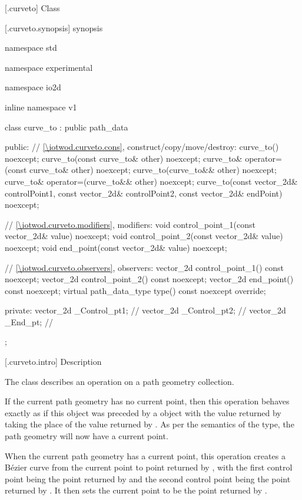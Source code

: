  [\iotwod.curveto] {Class }

 [\iotwod.curveto.synopsis] { synopsis}

\begin{codeblock}
namespace std { namespace experimental { namespace io2d { inline namespace v1 {
  class curve_to : public path_data {
  public:
    // \ref{\iotwod.curveto.cons}, construct/copy/move/destroy:
    curve_to() noexcept;
    curve_to(const curve_to& other) noexcept;
    curve_to& operator=(const curve_to& other) noexcept;
    curve_to(curve_to&& other) noexcept;
    curve_to& operator=(curve_to&& other) noexcept;
    curve_to(const vector_2d& controlPoint1, const vector_2d& controlPoint2,
      const vector_2d& endPoint) noexcept;

    // \ref{\iotwod.curveto.modifiers}, modifiers:
    void control_point_1(const vector_2d& value) noexcept;
    void control_point_2(const vector_2d& value) noexcept;
    void end_point(const vector_2d& value) noexcept;


    // \ref{\iotwod.curveto.observers}, observers:
    vector_2d control_point_1() const noexcept;
    vector_2d control_point_2() const noexcept;
    vector_2d end_point() const noexcept;
    virtual path_data_type type() const noexcept override;
    
  private:
    vector_2d _Control_pt1; // \expos
    vector_2d _Control_pt2; // \expos
    vector_2d _End_pt;      // \expos
  };
} } } }
\end{codeblock}

 [\iotwod.curveto.intro] { Description}

\pnum
{}
The class  describes an operation on a path geometry collection.

\pnum
If the current path geometry has no current point, then this operation behaves exactly as if this object was preceded by a  object with the value returned by  taking the place of the value returned by . As per the semantics of the  type, the path geometry will now have a current point.

\pnum
When the current path geometry has a current point, this operation creates a B\'ezier curve from the current point to point returned by , with the first control point being the point returned by  and the second control point being the point returned by . It then sets the current point to be the point returned by .

